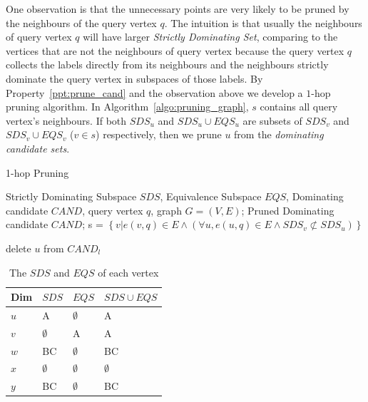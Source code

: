 One observation is that the unnecessary points are very likely to be pruned by the neighbours of the query vertex $q$. The intuition is that usually the neighbours of query vertex $q$ will have larger \emph{Strictly Dominating Set}, comparing to the vertices that are not the neighbours of query vertex because the query vertex $q$ collects the labels directly from its neighbours and the neighbours strictly dominate the query vertex in subspaces of those labels.
By Property~\ref{ppt:prune_cand} and the observation above we develop a $1$-hop pruning algorithm. In Algorithm~\ref{algo:pruning_graph}, $s$ contains all query vertex's neighbours. If both $SDS_u$ and $SDS_u \cup EQS_u$ are subsets of $SDS_v$ and $SDS_v \cup EQS_v$ ($v \in s$) respectively, then we prune $u$ from the \emph{dominating candidate sets}.

\begin{algorithm}[H]
  \caption{1-hop Pruning}
  \label{algo:pruning_graph}
  \begin{algorithmic}[1]
  \show\LOOP
    \REQUIRE Strictly Dominating Subspace $\mathit{SDS}$, Equivalence Subspace $\mathit{EQS}$, Dominating candidate $\mathit{CAND}$, query vertex $q$, graph $G=(V, E)$;
    \ENSURE Pruned Dominating candidate $\mathit{CAND}$;
    \STATE s = $\left\{v|e(v, q) \in E \wedge (\forall u, e(u, q) \in E \wedge SDS_v \not\subset SDS_u)\right\}$
    
                    \STATE delete $u$ from $\mathit{CAND}_l$
                \ENDIF
                
            \ENDFOR
        \ENDFOR
    \ENDFOR
  \end{algorithmic}
\end{algorithm}

\begin{table}[h]
    \centering
    \begin{tabular}{|l|l|l|l|}
    \hline
    Dim & $SDS$       & $EQS$       & $SDS \cup EQS$ \\ \hline
    $u$ & A           & $\emptyset$ & A              \\ \hline
    $v$ & $\emptyset$ & A           & A              \\ \hline
    $w$ & BC          & $\emptyset$ & BC             \\ \hline
    $x$ & $\emptyset$ & $\emptyset$ & $\emptyset$    \\ \hline
    $y$ & BC          & $\emptyset$ & BC             \\ \hline
    \end{tabular}
    \caption{The $SDS$ and $EQS$ of each vertex}
    \label{tab:SDS_EQS}
\end{table}

